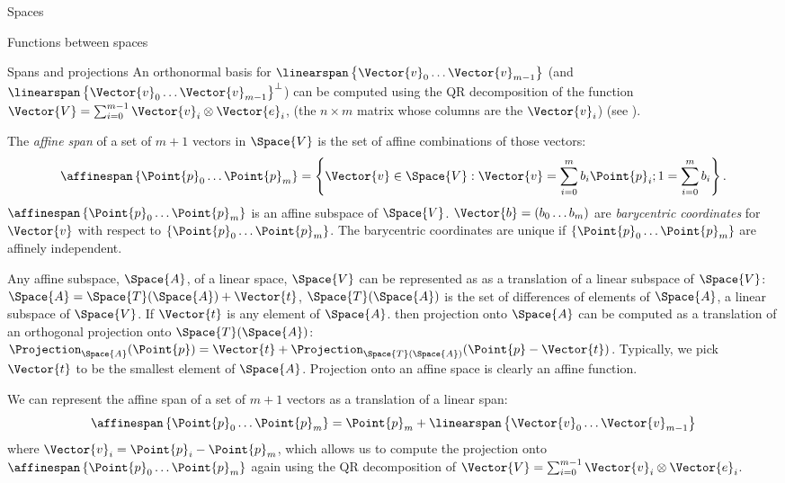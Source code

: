 \begin{plSection}{Spaces}
\begin{plSection}{Functions between spaces}
\begin{plSection}{Spans and projections}
An orthonormal basis for $\linearspan\left\{ \Vector{v}_0 \ldots \Vector{v}_{m-1} \right\}$
(and $\linearspan\left\{ \Vector{v}_0 \ldots \Vector{v}_{m-1} \right\}^\perp$)
can be computed using the QR decomposition
of the function $\Vector{V} = \sum_{i=0}^{m-1} \Vector{v}_i \otimes \Vector{e}_i$,
(the $n \times m$ matrix whose columns are the $\Vector{v}_i$)
(see ).

The \textit{affine span} of a set of $m+1$ vectors in $\Space{V}$
is the set of affine combinations of those vectors:
\begin{equation}
\affinespan\left\{ \Point{p}_0 \ldots \Point{p}_{m} \right\} = \left\{\Vector{v} \in \Space{V} : \Vector{v} = \sum_{i=0}^{m} b_i \Point{p}_i;
1 = \sum_{i=0}^{m} b_i \right\}.
\end{equation}
$\affinespan\left\{ \Point{p}_0 \ldots \Point{p}_{m} \right\}$ is an affine subspace of $\Space{V}$.
$\Vector{b} = ( b_0 \ldots b_m )$ are \textit{barycentric coordinates}
for $\Vector{v}$ with respect to $\left\{ \Point{p}_0 \ldots \Point{p}_{m} \right\}$.
The barycentric coordinates are unique if $\left\{ \Point{p}_0 \ldots \Point{p}_{m} \right\}$
are affinely independent.

Any affine subspace, $\Space{A}$, of a linear space, $\Space{V}$ can be represented as
as a translation of a linear subspace of $\Space{V}$:
$\Space{A} = \Space{T}(\Space{A}) + \Vector{t}$,
$\Space{T}(\Space{A})$ is the set of differences of elements of $\Space{A}$,
a linear subspace of $\Space{V}$.
If $\Vector{t}$ is any element of $\Space{A}$.
then projection onto $\Space{A}$
can be computed as a translation of an orthogonal projection onto $\Space{T}(\Space{A})$:
$\Projection_{\Space{A}} (\Point{p}) = \Vector{t} + \Projection_{\Space{T}(\Space{A})} (\Point{p} - \Vector{t})$.
Typically, we pick $\Vector{t}$ to be the smallest element of $\Space{A}$.
Projection onto an affine space is clearly an affine function.

We can represent the affine span of a set of $m+1$ vectors
as a translation of a linear span:
\begin{equation}
\affinespan\left\{ \Point{p}_0 \ldots \Point{p}_{m} \right\} = \Point{p}_m + \linearspan\left\{\Vector{v}_0 \ldots \Vector{v}_{m-1}\right\}
\end{equation}
where $\Vector{v}_i = \Point{p}_i - \Point{p}_m$,
which allows us to compute the projection onto
$\affinespan\left\{ \Point{p}_0 \ldots \Point{p}_{m} \right\}$
again using the QR decomposition
of $\Vector{V} = \sum_{i=0}^{m-1} \Vector{v}_i \otimes \Vector{e}_i$.


\end{plSection}
\end{plSection}
\end{plSection}
